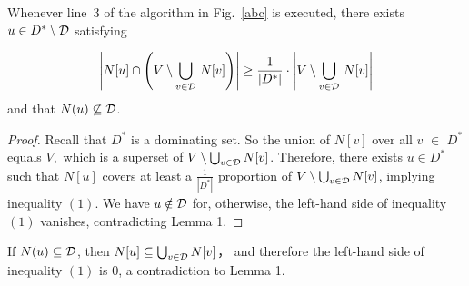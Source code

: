 \documentclass[12pt]{article}
\begin{document}
\begin{lemma}
Whenever line~3 of the algorithm in Fig.~\ref{abc} is executed,
there exists $u\in D^*\setminus {\cal D}$ satisfying

\begin{equation}
\left|N[u]\cap \left(V\setminus \bigcup_{v\in {\cal D}}\,N[v]\right)\right|
\ge \frac{1}{|D^*|}
\cdot\left|V\setminus \bigcup_{v\in {\cal D}}\,N[v]\right|
\label{lemma2-equation}
\end{equation}
and that $N(u)\not\subseteq {\cal D}$.
\end{lemma}

\begin{proof}
Recall that $D^*$ is a dominating set. So the union of $N[v]$ over all $v$ $\in$ $D^*$ equals $V, $ which is a superset of $V\setminus \bigcup_{v\in{\cal D}} N[v]$. Therefore, there exists $u\in D^*$ such that $N[u]$ covers at least a $\frac{1}{|D^*|}$ proportion of $V\setminus \bigcup_{v\in{\cal D}} N[v]$, implying inequality $(1)$. We have $u\notin {\cal D}$ for, otherwise, the left-hand side of inequality $(1)$ vanishes, contradicting Lemma 1.
\end{proof}
If $N(u)\subseteq {\cal D}$,  then $N[u]\subseteq \bigcup_{v\in {\cal D}} N[v]$， and therefore the left-hand side of inequality $(1)$ is 0, a contradiction to Lemma 1.


\clearpage
\end{document}
